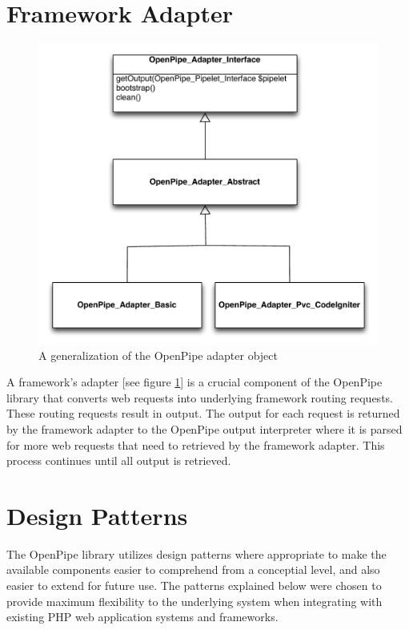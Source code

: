 \documentclass[12pt]{report}
\begin{document}
\section{Framework Adapter}

\begin{figure}[H]
\label{fig:generalizationAdapter}
\centering
\includegraphics[width=\textwidth,keepaspectratio]{figures/images/generalization_adapters.pdf}
\caption{A generalization of the OpenPipe adapter object}
\end{figure}

A framework's adapter [see figure \ref{fig:generalizationAdapter}]  is a crucial component of the OpenPipe library that converts web requests into underlying framework routing requests. These routing requests result in output. The output for each request is returned by the framework adapter to the OpenPipe output interpreter where it is parsed for more web requests that need to retrieved by the framework adapter. This process continues until all output is retrieved.


\section{Design Patterns}
The OpenPipe library utilizes design patterns where appropriate to make the available components easier to comprehend from a conceptial level, and also easier to extend for future use. The patterns explained below were chosen to provide maximum flexibility to the underlying system when integrating with existing PHP web application systems and frameworks.
\end{document}
